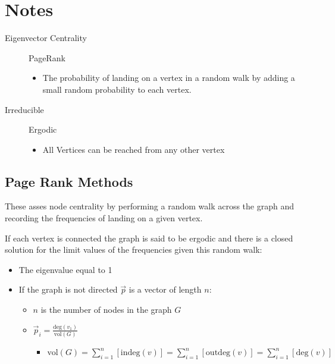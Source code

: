 \documentclass[11pt]{article}
\begin{document}
\section{Notes}
\label{sec:org5319e3b}

\begin{description}
\item[{Eigenvector Centrality}] PageRank

\begin{itemize}
\item The probability of landing on a vertex in a random walk by adding a small random probability to each vertex.
\end{itemize}

\item[{Irreducible}] Ergodic
\begin{itemize}
\item All Vertices can be reached from any other vertex
\end{itemize}
\end{description}

\subsection{Page Rank Methods}
\label{sec:org56f39aa}

These asses node centrality by performing a random walk across the graph and recording the frequencies of landing on a given vertex.

If each vertex is connected the graph is said to be ergodic and there is a closed solution for the limit values of the frequencies given this random walk:

\begin{itemize}
\item The eigenvalue equal to 1
\item If the graph is not directed \(\vec{p}\) is a vector of length \(n\):
\begin{itemize}
\item \(n\) is the number of nodes in the graph \(G\)
\item \(\vec{p}_{i} = \frac{\mathrm{deg}(v_{1})}{\mathrm{vol}(G)}\)
\begin{itemize}
\item \(\mathrm{vol}(G) = \sum^{n}_{i = 1} \left[ \mathrm{indeg}(v) \right] = \sum^{n}_{i = 1} \left[ \mathrm{outdeg}(v) \right ] = \sum^{n}_{i = 1} \left[ \mathrm{deg}(v) \right]\)
\end{itemize}
\end{itemize}
\end{itemize}
\end{document}
